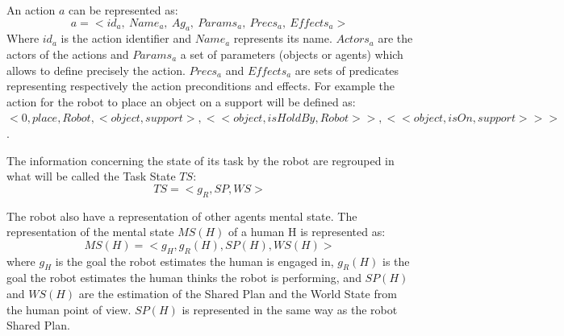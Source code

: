 \documentclass[english,a4paper,11pt,twoside]{StyleThese}
\begin{document}
An action $a$ can be represented as: 
$$a = < id_{a}, \ Name_{a}, \ Ag_{a}, \ Params_{a}, \ Precs_{a}, \ Effects_{a} >$$
Where $id_{a}$ is the action identifier and $Name_{a}$ represents its name. $Actors_{a}$ are the actors of the actions and $Params_{a}$ a set of parameters (objects or agents) which allows to define precisely the action. $Precs_{a}$ and $Effects_{a}$ are sets of predicates representing respectively the action preconditions and effects.
For example the action for the robot to place an object on a support will be defined as:$<0, place, Robot, <object, support>, <<object, isHoldBy, Robot>>, <<object, isOn, support>>>$.

The information concerning the state of its task by the robot are regrouped in what will be called the Task State $TS$:
$$TS = <g_R, SP, WS>$$

The robot also have a representation of other agents mental state. The representation of the mental state $MS(H)$ of a human H is represented as:
$$MS(H) = <g_H, g_R(H), SP(H), WS(H)>$$
where $g_H$ is the goal the robot estimates the human is engaged in, $g_R(H)$ is the goal the robot estimates the human thinks the robot is performing, and $SP(H)$ and $WS(H)$ are the estimation of the Shared Plan and the World State from the human point of view.
$SP(H)$ is represented in the same way as the robot Shared Plan.


\ifdefined{}
\else


\end{document}
